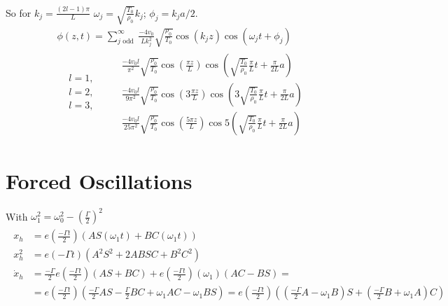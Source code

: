 \documentclass[twoside,10pt]{amsart}
\newcommand{\problemhead}[1]
  {\smallskip
   \noindent{\large\bf Problem #1.}
   \smallskip}
\begin{document}
So for $k_j = \frac{ (2l - 1 ) \pi }{ L }$ \quad $\omega_j = \sqrt{ \frac{T_0 }{ \rho_0 } } k_j$; \quad $\phi_j = k_j a/2$.  \[
\begin{gathered}
  \phi(z,t) = \sum_{ j \text{ odd } }^{\infty} \frac{ -4 v_0}{ L k_j^2} \sqrt{ \frac{ \rho_0}{ T_0} } \cos{ (k_j z) } \cos{ (\omega_j t + \phi_j) } \\
  \begin{aligned}
    & l = 1,  \\
    & l = 2,  \\ 
    & l = 3,  \\
  \end{aligned} \quad \quad
\begin{aligned}
  \frac{ -4 v_0 l}{ \pi^2 } \sqrt{ \frac{ \rho_0 }{T_0 }} \cos{ \left( \frac{ \pi z }{ L} \right) } \cos{ \left( \sqrt{ \frac{T_0}{\rho_0} } \frac{ \pi }{L} t + \frac{ \pi}{2L} a \right) } \\
  \frac{ -4 v_0 l}{ 9 \pi^2 } \sqrt{ \frac{ \rho_0 }{T_0 }} \cos{ \left( 3 \frac{ \pi z }{ L} \right) } \cos{ \left( 3 \sqrt{ \frac{T_0}{\rho_0} } \frac{ \pi }{L} t + \frac{ \pi}{2L} a \right) } \\
  \frac{ -4 v_0 l}{ 25\pi^2 } \sqrt{ \frac{ \rho_0 }{T_0 }} \cos{ \left( \frac{ 5 \pi z }{ L} \right) } \cos{ 5\left( \sqrt{ \frac{T_0}{\rho_0} } \frac{ \pi }{L} t + \frac{ \pi}{2L} a \right) } 
\end{aligned}
\end{gathered}
\]

\section{ Forced Oscillations }

\problemhead{3.1} With $\omega_1^2 = \omega_0^2 - \left( \frac{\Gamma}{2} \right)^2 $
\[
\begin{gathered}
\begin{aligned}
  x_h & = e\left( \frac{ -\Gamma t }{2} \right) (A S(\omega_1 t) + B C(\omega_1 t) ) \\
  x_h^2 & = e\left( -\Gamma t \right) (A^2 S^2 + 2ABSC + B^2 C^2 ) \\
  \dot{x}_h & = \frac{ -\Gamma}{2} e\left( \frac{ -\Gamma t }{ 2} \right) (AS +BC) + e\left( \frac{ -\Gamma t}{2} \right)(\omega_1) (AC -BS) = \\
  & = e\left( \frac{ -\Gamma t}{2} \right)\left( \frac{ -\Gamma}{2} AS - \frac{ \Gamma}{2} BC + \omega_1 AC - \omega_1 BS\right) = e\left( \frac{ -\Gamma t}{2} \right)\left( \left( \frac{-\Gamma}{2} A - \omega_1 B \right)S + \left( \frac{-\Gamma}{2} B + \omega_1 A \right)C \right)  
\end{aligned} 
\end{gathered}
\]
\end{document}
